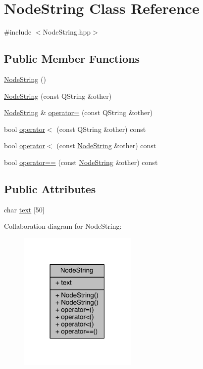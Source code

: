 \hypertarget{class_node_string}{\section{Node\+String Class Reference}
\label{class_node_string}
}


{\ttfamily \#include $<$Node\+String.\+hpp$>$}

\subsection*{Public Member Functions}
\begin{DoxyCompactItemize}
\item 
\hyperlink{class_node_string_a2f71f64a394986b0d8be1e48e668479e}{Node\+String} ()
\item 
\hyperlink{class_node_string_ae412749f07a27c636d83764fc1947b73}{Node\+String} (const Q\+String \&other)
\item 
\hyperlink{class_node_string}{Node\+String} \& \hyperlink{class_node_string_afbf19ea9ebc02114ad010be4327a27f9}{operator=} (const Q\+String \&other)
\item 
bool \hyperlink{class_node_string_a2a5b557cbf4fa6a36740bbb45fc86dfe}{operator$<$} (const Q\+String \&other) const 
\item 
bool \hyperlink{class_node_string_acd5556ea34f145e9ea89c8e03b260675}{operator$<$} (const \hyperlink{class_node_string}{Node\+String} \&other) const 
\item 
bool \hyperlink{class_node_string_a7aff986ffbdcb4813604e3558d8c7529}{operator==} (const \hyperlink{class_node_string}{Node\+String} \&other) const 
\end{DoxyCompactItemize}
\subsection*{Public Attributes}
\begin{DoxyCompactItemize}
\item 
char \hyperlink{class_node_string_a8a64f19c7c29bd0fd1c95311afe884d3}{text} \mbox{[}50\mbox{]}
\end{DoxyCompactItemize}


Collaboration diagram for Node\+String\+:\nopagebreak
\begin{figure}[H]
\begin{center}
\leavevmode
\includegraphics[width=162pt]{class_node_string__coll__graph}
\end{center}
\end{figure}


